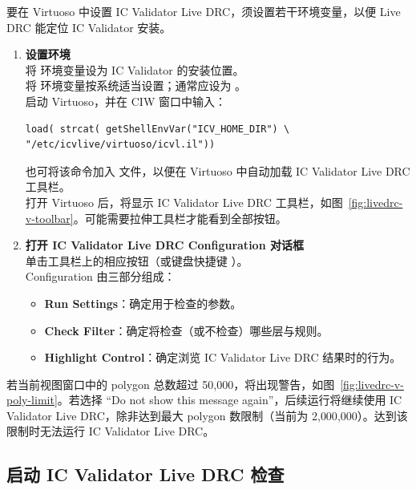 要在 Virtuoso 中设置 IC Validator Live DRC，须设置若干环境变量，以便 Live DRC 能定位 IC Validator 安装。
\begin{enumerate}
  \item \textbf{设置环境}\\
  将  环境变量设为 IC Validator 的安装位置。\\
  将  环境变量按系统适当设置；通常应设为 。\\
  启动 Virtuoso，并在 CIW 窗口中输入：
\begin{lstlisting}
load( strcat( getShellEnvVar("ICV_HOME_DIR") \
"/etc/icvlive/virtuoso/icvl.il"))
\end{lstlisting}
  也可将该命令加入  文件，以便在 Virtuoso 中自动加载 IC Validator Live DRC 工具栏。\\
  打开 Virtuoso 后，将显示 IC Validator Live DRC 工具栏，如图~\ref{fig:livedrc-v-toolbar}。可能需要拉伸工具栏才能看到全部按钮。


  \item \textbf{打开 IC Validator Live DRC Configuration 对话框}\\
  单击工具栏上的相应按钮（或键盘快捷键 ）。\\
  Configuration 由三部分组成：
  \begin{itemize}
    \item \textbf{Run Settings}：确定用于检查的参数。
    \item \textbf{Check Filter}：确定将检查（或不检查）哪些层与规则。
    \item \textbf{Highlight Control}：确定浏览 IC Validator Live DRC 结果时的行为。
  \end{itemize}
\end{enumerate}

若当前视图窗口中的 polygon 总数超过 50{,}000，将出现警告，如图~\ref{fig:livedrc-v-poly-limit}。若选择 ``Do not show this message again''，后续运行将继续使用 IC Validator Live DRC，除非达到最大 polygon 数限制（当前为 2{,}000{,}000）。达到该限制时无法运行 IC Validator Live DRC。


\subsection{启动 IC Validator Live DRC 检查}
